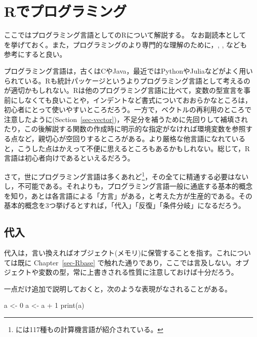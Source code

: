 \documentclass[
  a4paper,
]{ltjsbook}
\newenvironment{Shaded}{\begin{snugshade}}{\end{snugshade}}
\newcommand{\DecValTok}[1]{\textcolor[rgb]{0.68,0.00,0.00}{#1}}
\newcommand{\FunctionTok}[1]{\textcolor[rgb]{0.28,0.35,0.67}{#1}}
\newcommand{\NormalTok}[1]{\textcolor[rgb]{0.00,0.23,0.31}{#1}}
\newcommand{\OtherTok}[1]{\textcolor[rgb]{0.00,0.23,0.31}{#1}}
\newcommand{\SpecialCharTok}[1]{\textcolor[rgb]{0.37,0.37,0.37}{#1}}
\begin{document}

\chapter{Rでプログラミング}\label{rux3067ux30d7ux30edux30b0ux30e9ux30dfux30f3ux30b0}

ここではプログラミング言語としてのRについて解説する。
なお副読本として\autocite{kosugi2023}
を挙げておく。また，プログラミングのより専門的な理解のために，\autocite{Jared_P_Lander2018-12-28},
\autocite{Ren_Kun2017-11-23}, \autocite{Hadley_Wickham2016-02-10}
なども参考にすると良い。

プログラミング言語は，古くはCやJava，最近ではPythonやJuliaなどがよく用いられている。Rも統計パッケージというよりプログラミング言語として考えるのが適切かもしれない。Rは他のプログラミング言語に比べて，変数の型宣言を事前にしなくても良いことや，インデントなど書式についておおらかなところは，初心者にとって使いやすいところだろう。一方で，ベクトルの再利用のところで注意したように(Section~\ref{sec-vector})，不足分を補うために先回りして補填されたり，この後解説する関数の作成時に明示的な指定がなければ環境変数を参照する点など，親切心が空回りするところがある。より厳格な他言語になれていると，こうした点はかえって不便に思えるところもあるかもしれない。総じて，R言語は初心者向けであるといえるだろう。

さて，世にプログラミング言語は多くあれど\footnote{\autocite{Language2016}
  には117種もの計算機言語が紹介されている。}，その全てに精通する必要はないし，不可能である。それよりも，プログラミング言語一般に通底する基本的概念を知り，あとは各言語による「方言」がある，と考えた方が生産的である。その基本的概念を3つ挙げるとすれば，「代入」「反復」「条件分岐」になるだろう。

\section{代入}\label{ux4ee3ux5165}

代入は，言い換えればオブジェクト(メモリ)に保管することを指す。これについては既に
Chapter~\ref{sec-Rbase}
で触れた通りであり，ここでは言及しない。オブジェクトや変数の型，常に上書きされる性質に注意しておけば十分だろう。

一点だけ追加で説明しておくと，次のような表現がなされることがある。

\begin{Shaded}
\begin{Highlighting}[]
\NormalTok{a }\OtherTok{\textless{}{-}} \DecValTok{0}
\NormalTok{a }\OtherTok{\textless{}{-}}\NormalTok{ a }\SpecialCharTok{+} \DecValTok{1}
\FunctionTok{print}\NormalTok{(a)}
\end{Highlighting}
\end{Shaded}
\end{document}
